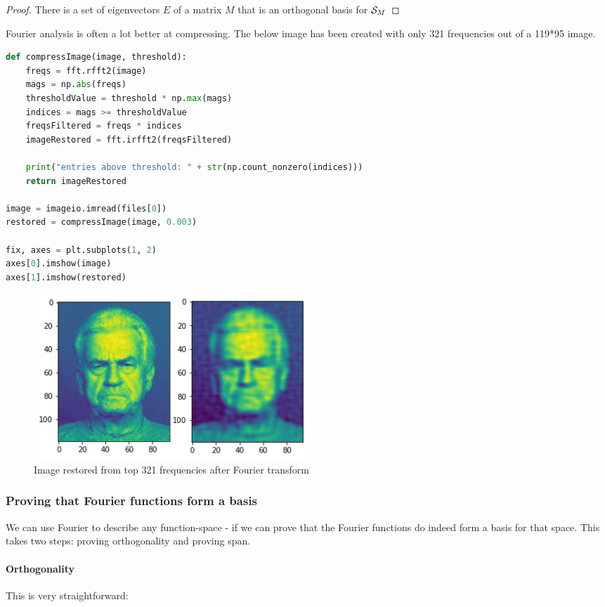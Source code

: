\begin{proof}There is a set of eigenvectors $E$ of a matrix $M$ that is an orthogonal basis for $\mathcal{S}_{M}$
    \subprf{}{}{}
\end{proof}

Fourier analysis is often a lot better at compressing. The below image has been created with only 321 frequencies out of a 119*95 image.
\begin{lstlisting}[language=python]
def compressImage(image, threshold):
    freqs = fft.rfft2(image)
    mags = np.abs(freqs)
    thresholdValue = threshold * np.max(mags)
    indices = mags >= thresholdValue
    freqsFiltered = freqs * indices
    imageRestored = fft.irfft2(freqsFiltered)

    print("entries above threshold: " + str(np.count_nonzero(indices)))
    return imageRestored

image = imageio.imread(files[0])
restored = compressImage(image, 0.003)

fix, axes = plt.subplots(1, 2)
axes[0].imshow(image)
axes[1].imshow(restored)
\end{lstlisting}

\begin{figure}[h]
    \caption{Image restored from top 321 frequencies after Fourier transform}
    \centering
      \includegraphics[width=0.5\textwidth]{images/fourier_compression.png}
\end{figure}


\subsubsection{Proving that Fourier functions form a basis}

We can use Fourier to describe any function-space - if we can prove that the Fourier functions do indeed form a basis for that space.
This takes two steps: proving orthogonality and proving span.

\paragraph{Orthogonality} This is very straightforward: 

